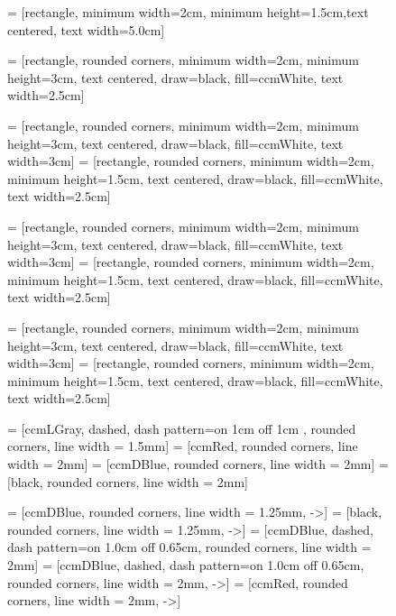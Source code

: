 \begin{figure}[!htb]
    \centering
    
       = [rectangle, minimum width=2cm, minimum height=1.5cm,text centered, text width=5.0cm]

       = [rectangle, rounded corners, minimum width=2cm, minimum height=3cm,   text centered, draw=black, fill=ccmWhite, text width=2.5cm]
    
       = [rectangle, rounded corners, minimum width=2cm, minimum height=3cm,   text centered, draw=black, fill=ccmWhite, text width=3cm]
      = [rectangle, rounded corners, minimum width=2cm, minimum height=1.5cm, text centered, draw=black, fill=ccmWhite, text width=2.5cm]
    
        = [rectangle, rounded corners, minimum width=2cm, minimum height=3cm,   text centered, draw=black, fill=ccmWhite, text width=3cm]
      = [rectangle, rounded corners, minimum width=2cm, minimum height=1.5cm, text centered, draw=black, fill=ccmWhite, text width=2.5cm]
    
        = [rectangle, rounded corners, minimum width=2cm, minimum height=3cm,   text centered, draw=black, fill=ccmWhite, text width=3cm]
      = [rectangle, rounded corners, minimum width=2cm, minimum height=1.5cm, text centered, draw=black, fill=ccmWhite, text width=2.5cm]
    
     = [ccmLGray, dashed, dash pattern=on 1cm off 1cm , rounded corners, line width = 1.5mm]
     = [ccmRed, rounded corners, line width = 2mm]
     = [ccmDBlue, rounded corners, line width = 2mm]
     = [black, rounded corners, line width = 2mm]
    
     = [ccmDBlue, rounded corners, line width = 1.25mm, ->]
     = [black, rounded corners, line width = 1.25mm, ->]
     = [ccmDBlue, dashed, dash pattern=on 1.0cm off 0.65cm, rounded corners, line width = 2mm]
     = [ccmDBlue, dashed, dash pattern=on 1.0cm off 0.65cm, rounded corners, line width = 2mm, ->]
     = [ccmRed, rounded corners, line width = 2mm, ->]
    

\end{figure}
